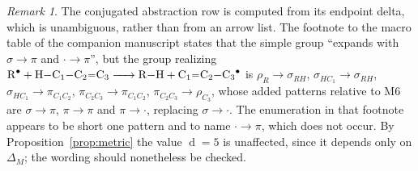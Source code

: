 \documentclass[11pt]{article}
\numberwithin{equation}{section}
\newcommand{\del}{\operatorname{d}}
\theoremstyle{plain}
\theoremstyle{definition}
\theoremstyle{remark}
\newtheorem{remark}[theorem]{Remark}
\begin{document}
\begin{remark}
\label{rem:conj-footnote}
The conjugated abstraction row is computed from its endpoint delta, which is
unambiguous, rather than from an arrow list.  The footnote to the macro table
of the companion manuscript states that the simple group ``expands with
$\sigma\to\pi$ and $\boldsymbol\cdot\to\pi$'', but the group realizing
$\ce{R^{.} + H-C_1-C_2=C_3 -> R-H + C_1=C_2-C_3^{.}}$ is
$\rho_R\to\sigma_{RH}$, $\sigma_{HC_1}\to\sigma_{RH}$,
$\sigma_{HC_1}\to\pi_{C_1C_2}$, $\pi_{C_2C_3}\to\pi_{C_1C_2}$,
$\pi_{C_2C_3}\to\rho_{C_3}$, whose added patterns relative to M6 are
$\sigma\to\pi$, $\pi\to\pi$ and $\pi\to\boldsymbol\cdot$, replacing
$\sigma\to\boldsymbol\cdot$.  The enumeration in that footnote appears to be
short one pattern and to name $\boldsymbol\cdot\to\pi$, which does not occur.
By Proposition~\ref{prop:metric} the value $\del=5$ is unaffected, since it
depends only on $\Delta_M$; the wording should nonetheless be checked.
\end{remark}
\end{document}
